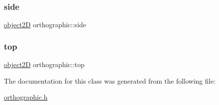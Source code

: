 \mbox{\label{classorthographic_a37d0964ad1151feda26b3c9498b1075b}} 
\subsubsection{\texorpdfstring{side}{side}}
{\footnotesize\ttfamily \mbox{\hyperlink{classobject2D}{object2D}} orthographic\+::side}

\mbox{\label{classorthographic_ac0978ff6a9a243e3d8ed21efffe041b4}} 
\subsubsection{\texorpdfstring{top}{top}}
{\footnotesize\ttfamily \mbox{\hyperlink{classobject2D}{object2D}} orthographic\+::top}



The documentation for this class was generated from the following file\+:\begin{DoxyCompactItemize}
\item 
\mbox{\hyperlink{orthographic_8h}{orthographic.\+h}}\end{DoxyCompactItemize}
